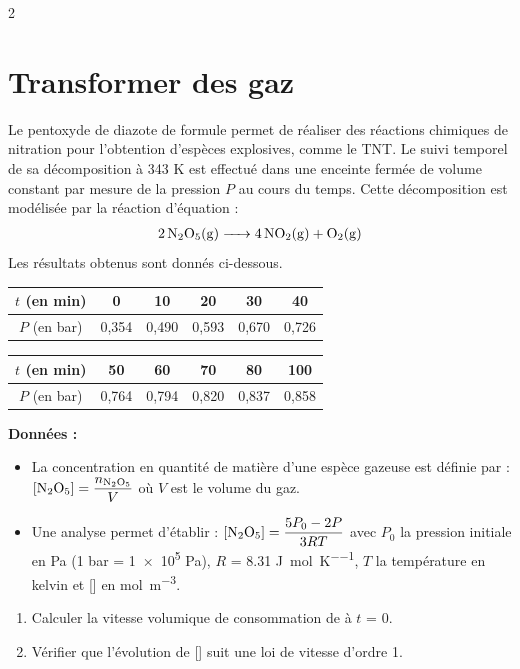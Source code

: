 \documentclass[a4paper,11pt,fleqn]{article}%
\begin{document}
\begin{multicols}{2}
\section{Transformer des gaz}
Le pentoxyde de diazote de formule  permet de réaliser des réactions chimiques de nitration pour l'obtention d'espèces explosives, comme le TNT. Le suivi temporel de sa décomposition à \num{343} \unit{\kelvin} est effectué dans une enceinte fermée de volume constant par mesure de la pression $P$ au cours du temps. Cette décomposition est modélisée par la réaction d'équation :
\begin{eqnarray}
    \ce{2N2O5(g) -> 4NO2(g) + O2(g)}\nonumber
\end{eqnarray}
Les résultats obtenus sont donnés ci-dessous.
\begin{center}
    \begin{tabular}{|c|c|c|c|c|c|}
    \hline $t$ (en min) & 0 & 10 & 20 & 30 & 40\\
    \hline $P$ (en bar) & 0,354 & 0,490 & 0,593 & 0,670 & 0,726\\
    \hline
    \end{tabular}
    \begin{tabular}{|c|c|c|c|c|c|}
    \hline $t$ (en min) & 50 & 60 & 70 & 80 & 100\\
    \hline $P$ (en bar) & 0,764 & 0,794 & 0,820 & 0,837 & 0,858\\
    \hline
    \end{tabular}
\end{center}

\textbf{Données :}\\
\begin{itemize}
    \item La concentration en quantité de matière d'une espèce gazeuse est définie par : $[\ce{N2O5}] = \dfrac{n_{\ce{N2O5}}}{V}$ où $V$ est le volume du gaz.
    \item Une analyse permet d'établir : $[\ce{N2O5}] = \dfrac{5P_0-2P}{3RT}$ avec $P_0$ la pression initiale en \unit{\pascal} (1 bar = \num{1e5} \unit{\pascal}), $R$ = \num{8,31} \unit{\joule\per\mole\per\kelvin}, $T$ la température  en kelvin et [] en \unit{\mole\per\meter\cubed}.
\end{itemize}
\begin{enumerate}
    \item Calculer la vitesse volumique de consommation de  à $t$ = 0.
    \item Vérifier que l'évolution de [] suit une loi de vitesse d'ordre 1.
\end{enumerate}


\end{multicols}
\end{document}

